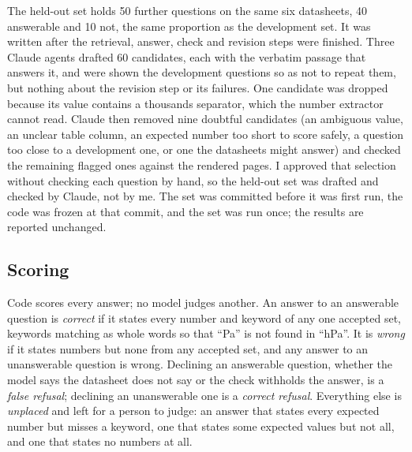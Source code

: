 The held-out set holds 50 further questions on the same six datasheets, 40 answerable and 10 not, the same proportion as the development set. It was written after the retrieval, answer, check and revision steps were finished. Three Claude agents drafted 60 candidates, each with the verbatim passage that answers it, and were shown the development questions so as not to repeat them, but nothing about the revision step or its failures. One candidate was dropped because its value contains a thousands separator, which the number extractor cannot read. Claude then removed nine doubtful candidates (an ambiguous value, an unclear table column, an expected number too short to score safely, a question too close to a development one, or one the datasheets might answer) and checked the remaining flagged ones against the rendered pages. I approved that selection without checking each question by hand, so the held-out set was drafted and checked by Claude, not by me. The set was committed before it was first run, the code was frozen at that commit, and the set was run once; the results are reported unchanged.

\subsection{Scoring}

Code scores every answer; no model judges another. An answer to an answerable question is \emph{correct} if it states every number and keyword of any one accepted set, keywords matching as whole words so that \enquote{Pa} is not found in \enquote{hPa}. It is \emph{wrong} if it states numbers but none from any accepted set, and any answer to an unanswerable question is wrong. Declining an answerable question, whether the model says the datasheet does not say or the check withholds the answer, is a \emph{false refusal}; declining an unanswerable one is a \emph{correct refusal}. Everything else is \emph{unplaced} and left for a person to judge: an answer that states every expected number but misses a keyword, one that states some expected values but not all, and one that states no numbers at all.
